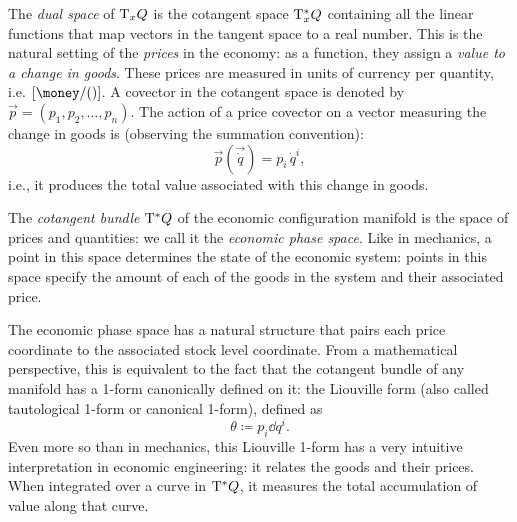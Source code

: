 The \emph{dual space} of \(\mathrm{T}_{x} Q\) is the cotangent space \(\mathrm{T}_{x}^*Q\) containing all the linear functions that map vectors in the tangent space to a real number. This is the natural setting of the \emph{prices} in the economy: as a function, they assign a \emph{value to a change in goods}. These prices are measured in units of currency per quantity, i.e. \(\qty[\si{\money \per \quantity}]\). A covector in the cotangent space is denoted by \(\vec{p} = (p_1, p_2, \ldots, p_n)\). The action of a price covector on a vector measuring the change in goods is (observing the summation convention):
\begin{equation}
    \vec{p}(\vec{\dot{q}}) = p_i\,\dot{q}^i,
\end{equation}
i.e., it produces the total value associated with this change in goods.


The \emph{cotangent bundle} \(\mathrm{T}^*Q\) of the economic configuration manifold is the space of prices and quantities: we call it the \emph{economic phase space}. Like in mechanics, a point in this space determines the state of the economic system: points in this space specify the amount of each of the goods in the system and their associated price.

The economic phase space has a natural structure that pairs each price coordinate to the associated stock level coordinate. From a mathematical perspective, this is equivalent to the fact that the cotangent bundle of any manifold has a 1-form canonically defined on it: the Liouville form (also called tautological 1-form or canonical 1-form), defined as
\begin{equation} 
    \theta \coloneq  p_i \dd{q}^i.
\end{equation}
Even more so than in mechanics, this Liouville 1-form has a very intuitive interpretation in economic engineering: it relates the goods and their prices. When integrated over a curve in \(\mathrm{T}^*Q\), it measures the total accumulation of value along that curve.

